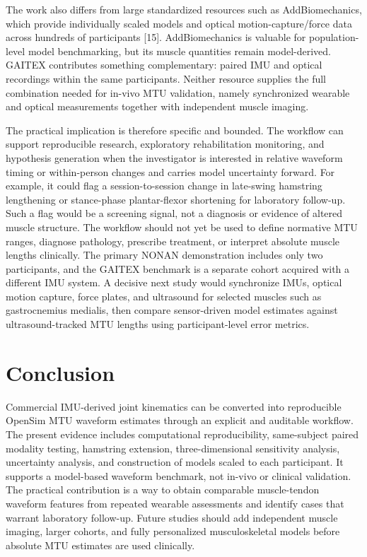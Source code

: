 \documentclass[11pt]{article}
\begin{document}
The work also differs from large standardized resources such as AddBiomechanics, which provide individually scaled models and optical motion-capture/force data across hundreds of participants [15]. AddBiomechanics is valuable for population-level model benchmarking, but its muscle quantities remain model-derived. GAITEX contributes something complementary: paired IMU and optical recordings within the same participants. Neither resource supplies the full combination needed for in-vivo MTU validation, namely synchronized wearable and optical measurements together with independent muscle imaging.

The practical implication is therefore specific and bounded. The workflow can support reproducible research, exploratory rehabilitation monitoring, and hypothesis generation when the investigator is interested in relative waveform timing or within-person changes and carries model uncertainty forward. For example, it could flag a session-to-session change in late-swing hamstring lengthening or stance-phase plantar-flexor shortening for laboratory follow-up. Such a flag would be a screening signal, not a diagnosis or evidence of altered muscle structure. The workflow should not yet be used to define normative MTU ranges, diagnose pathology, prescribe treatment, or interpret absolute muscle lengths clinically. The primary NONAN demonstration includes only two participants, and the GAITEX benchmark is a separate cohort acquired with a different IMU system. A decisive next study would synchronize IMUs, optical motion capture, force plates, and ultrasound for selected muscles such as gastrocnemius medialis, then compare sensor-driven model estimates against ultrasound-tracked MTU lengths using participant-level error metrics.

\section{Conclusion}

Commercial IMU-derived joint kinematics can be converted into reproducible OpenSim MTU waveform estimates through an explicit and auditable workflow. The present evidence includes computational reproducibility, same-subject paired modality testing, hamstring extension, three-dimensional sensitivity analysis, uncertainty analysis, and construction of models scaled to each participant. It supports a model-based waveform benchmark, not in-vivo or clinical validation. The practical contribution is a way to obtain comparable muscle-tendon waveform features from repeated wearable assessments and identify cases that warrant laboratory follow-up. Future studies should add independent muscle imaging, larger cohorts, and fully personalized musculoskeletal models before absolute MTU estimates are used clinically.
\end{document}

